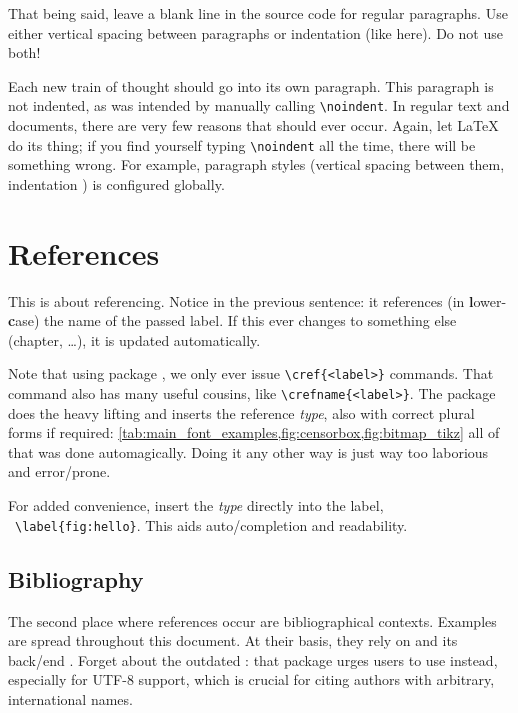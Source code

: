 That being said, leave a blank line in the source code for regular paragraphs.
Use either vertical spacing between paragraphs or indentation (like here).
Do not use both!

\noindent
Each new train of thought should go into its own paragraph.
This paragraph is not indented, as was intended by manually calling \verb|\noindent|.
In regular text and documents, there are very few reasons that should ever occur.
Again, let \LaTeX{} do its thing; if you find yourself typing \verb|\noindent|
all the time, there will be something wrong.
For example, paragraph styles (vertical spacing between them, indentation )
is configured globally.

\section{References}
\label{ch:references}

This \textcolor{mRed}{} is about referencing.
Notice {\color{mRed}{\verb|\lcnamecref|}} in the previous sentence:
it references (in \textbf{l}ower-\textbf{c}ase) the name of the passed label.
If this  ever changes to something else (chapter, \dots),
it is updated automatically.

Note that using package , we only ever issue
\verb|\cref{<label>}| commands.
That command also has many useful cousins, like \verb|\crefname{<label>}|.
The package does the heavy lifting and inserts the reference \emph{type},
also with correct plural forms if required:
\cref{tab:main_font_examples,fig:censorbox,fig:bitmap_tikz}
\textleftarrow{} all of that was done automagically.
Doing it any other way is just way too laborious and error\-/prone.

For added convenience, insert the \emph{type} directly into the label,
\ \verb|\label{fig:hello}|.
This aids auto\-/completion and readability.

\subsection{Bibliography}

The second place where references occur are bibliographical contexts.
Examples are spread throughout this document.
At their basis, they rely on  and its back\-/end
.
Forget about the outdated : that package urges users to use
 instead, especially for UTF-8 support, which is crucial
for citing authors with arbitrary, international names.

